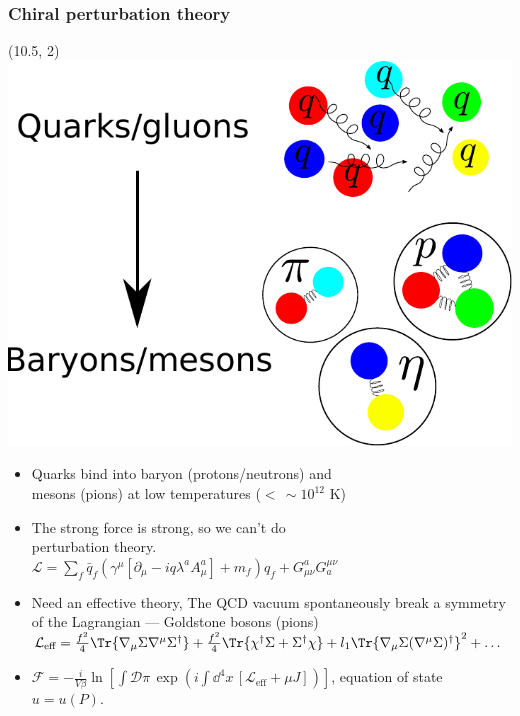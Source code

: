 \documentclass[aspectratio=169]{beamer}
\begin{document}
    \begin{frame}

        \frametitle{Chiral perturbation theory}

        \begin{textblock}{4.8}(10.5, 2)
            \includegraphics[width=\textwidth]{quarks-to-mesons.pdf}
        \end{textblock}

        \begin{itemize}
            \itemsep 0.4cm
            \item Quarks bind into baryon (protons/neutrons) and \\ mesons (pions) at low temperatures ($< \, \sim10^{12}$ K)
            \item The strong force is strong, so we can't do\\ perturbation theory.\\
            $
            \mathcal L = 
            \sum_f \bar q_f (\gamma^\mu [\partial_\mu - i q \lambda^a A^a_\mu ] + m_f)q_f
            + G^a_{\mu \nu} G_a^{\mu \nu}
            $
            \item Need an effective theory, The QCD vacuum spontaneously break a symmetry of the Lagrangian --- Goldstone bosons (pions)\\
            $
            \mathcal L_\text{eff} = 
            \frac{f^2}{4} \Tr{\nabla_\mu \Sigma \nabla^\mu \Sigma^\dagger}
            + \frac{f^2}{4} \Tr{\chi^\dagger \Sigma + \Sigma^\dagger \chi} 
            + l_1 \Tr{\nabla_\mu \Sigma (\nabla^\mu \Sigma)^\dagger}^2+
            \dots
            $ \\
            \item $
            \mathcal{F}
            = -\frac{i}{V \beta} 
            \ln\left[
                 \int \mathcal D \pi \, \exp
                 \left(
                    i \int \dd^4x \, [\mathcal{L}_\text{eff} + \mu J]
                 \right)
            \right]
            $, 
            equation of state $u = u(P)$.

        \end{itemize}

    \end{frame}
\end{document}
